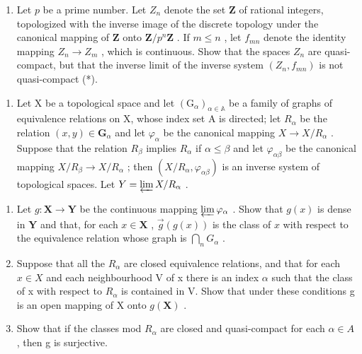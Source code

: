 \begin{enumerate}
\def\labelenumi{\alph{enumi})}
\setcounter{enumi}{1}
\tightlist
\item
  Let \(p\) be a prime number. Let \(Z_{n}\) denote the set \(\mathbf{Z}\) of rational integers, topologized with the inverse image of the discrete topology under the canonical mapping of \(\mathbf{Z}\) onto \(\mathbf{Z} / p^{n}\mathbf{Z}\) . If \(m \leqslant n\) , let \(f_{mn}\) denote the identity mapping \(Z_{n} \to Z_{m}\) , which is continuous. Show that the spaces \(Z_{n}\) are quasi-compact, but that the inverse limit of the inverse system \((Z_{n}, f_{mn})\) is not quasi-compact (*).
\end{enumerate}

\begin{enumerate}
\def\labelenumi{\arabic{enumi})}
\setcounter{enumi}{7}
\tightlist
\item
  Let X be a topological space and let \((\mathrm{G}_{\alpha})_{\alpha\in\mathbb{A}}\) be a family of graphs of equivalence relations on X, whose index set A is directed; let \(R_{\alpha}\) be the relation \((x,y)\in\mathbf{G}_{\alpha}\) and let \(\varphi_{\alpha}\) be the canonical mapping \(X\to X/R_{\alpha}\) . Suppose that the relation \(R_{\beta}\) implies \(R_{\alpha}\) if \(\alpha\leqslant\beta\) and let \(\varphi_{\alpha\beta}\) be the canonical mapping \(X/R_{\beta}\to X/R_{\alpha}\) ; then \((X/R_{\alpha},\varphi_{\alpha\beta})\) is an inverse system of topological spaces. Let \(Y=\varprojlim X/R_{\alpha}\) .
\end{enumerate}

\begin{enumerate}
\def\labelenumi{\alph{enumi})}
\item
  Let \(g: \mathbf{X} \to \mathbf{Y}\) be the continuous mapping \(\varprojlim \varphi_{\alpha}\) . Show that \(g(x)\) is dense in \(\mathbf{Y}\) and that, for each \(x \in \mathbf{X}\) , \(\overrightarrow{g}(g(x))\) is the class of \(x\) with respect to the equivalence relation whose graph is \(\bigcap_{n} G_{\alpha}\) .
\item
  Suppose that all the \(R_{\alpha}\) are closed equivalence relations, and that for each \(x \in X\) and each neighbourhood V of x there is an index \(\alpha\) such that the class of x with respect to \(R_{\alpha}\) is contained in V. Show that under these conditions g is an open mapping of X onto \(g(\mathbf{X})\) .
\item
  Show that if the classes mod \(R_{\alpha}\) are closed and quasi-compact for each \(\alpha \in A\) , then g is surjective.
\end{enumerate}

